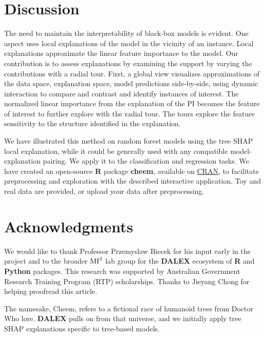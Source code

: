 \documentclass[
]{article}
\begin{document}
\hypertarget{sec:cheemdiscussion}{%
\section{Discussion}\label{sec:cheemdiscussion}}

The need to maintain the interpretability of black-box models is evident. One aspect uses local explanations of the model in the vicinity of an instance. Local explanations approximate the linear feature importance to the model. Our contribution is to assess explanations by examining the support by varying the contributions with a radial tour. First, a global view visualizes approximations of the data space, explanation space, model predictions side-by-side, using dynamic interaction to compare and contrast and identify instances of interest. The normalized linear importance from the explanation of the PI becomes the feature of interest to further explore with the radial tour. The tours explore the feature sensitivity to the structure identified in the explanation.

We have illustrated this method on random forest models using the tree SHAP local explanation, while it could be generally used with any compatible model-explanation pairing. We apply it to the classification and regression tasks. We have created an open-source \textbf{R} package \textbf{cheem}, available on \href{https://CRAN.R-project.org/package=cheem}{CRAN}, to facilitate preprocessing and exploration with the described interactive application. Toy and real data are provided, or upload your data after preprocessing.

\hypertarget{acknowledgments}{%
\section{Acknowledgments}\label{acknowledgments}}

We would like to thank Professor Przemyslaw Biecek for his input early in the project and to the broader \(\text{MI}^\text2\) lab group for the \textbf{DALEX} ecosystem of \textbf{R} and \textbf{Python} packages. This research was supported by Australian Government Research Training Program (RTP) scholarships. Thanks to Jieyang Chong for helping proofread this article.

The namesake, Cheem, refers to a fictional race of humanoid trees from Doctor Who lore. \textbf{DALEX} pulls on from that universe, and we initially apply tree SHAP explanations specific to tree-based models.
\end{document}

